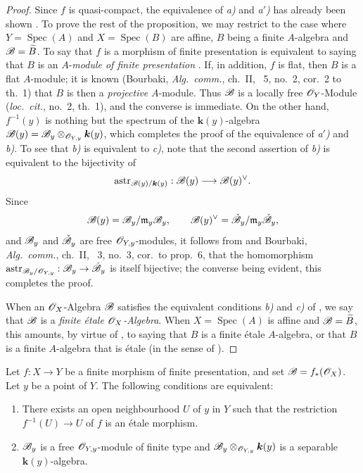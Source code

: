 \begin{proof}
Since $f$ is quasi-compact, the equivalence of \emph{a)} and \emph{a$'$)} has already been shown .
To prove the rest of the proposition, we may restrict to the case where $Y=\operatorname{Spec}(A)$ and $X=\operatorname{Spec}(B)$ are affine, $B$ being a finite $A$-algebra and $\mathscr{B}=\widetilde{B}$.
To say that $f$ is a morphism of finite presentation is equivalent to saying that $B$ is an $A$-\emph{module of finite presentation} .
If, in addition, $f$ is flat, then $B$ is a flat $A$-module; it is known (Bourbaki, \emph{Alg.\ comm.}, ch.~II, \textsection~5, no.~2, cor.~2 to th.~1) that $B$ is then a \emph{projective} $A$-module.  Thus $\mathscr{B}$ is a locally free $\mathscr{O}_Y$-Module (\emph{loc.\ cit.}, no.~2, th.~1), and the converse is immediate.
On the other hand, $f^{-1}(y)$ is nothing but the spectrum of the $\boldsymbol{k}(y)$-algebra $\mathscr{B}(y)=\mathscr{B}_y\otimes_{\mathscr{O}_{Y,y}}\boldsymbol{k}(y)$, which completes the proof of the equivalence of \emph{a$'$)} and \emph{b)}.
To see that \emph{b)} is equivalent to \emph{c)}, note that the second assertion of \emph{b)} is equivalent to the bijectivity of
\[
 \operatorname{astr}_{\mathscr{B}(y)/\boldsymbol{k}(y)}:\mathscr{B}(y)\longrightarrow\mathscr{B}(y)^\vee.
\]
Since
\[
 \mathscr{B}(y)=\mathscr{B}_y/\mathfrak{m}_y\mathscr{B}_y,
 \qquad
 \mathscr{B}(y)^\vee=\check{\mathscr{B}}_y/\mathfrak{m}_y\check{\mathscr{B}}_y,
\]
and $\mathscr{B}_y$ and $\check{\mathscr{B}}_y$ are free $\mathscr{O}_{Y,y}$-modules, it follows from  and Bourbaki, \emph{Alg.\ comm.}, ch.~II, \textsection~3, no.~3, cor.\ to prop.~6, that the homomorphism $\operatorname{astr}_{\mathscr{B}_y/\mathscr{O}_{Y,y}}:\mathscr{B}_y\to\check{\mathscr{B}}_y$ is itself bijective;
the converse being evident, this completes the proof.

When an $\mathscr{O}_X$-Algebra $\mathscr{B}$ satisfies the equivalent conditions \emph{b)} and \emph{c)} of , we say that $\mathscr{B}$ is a \emph{finite \'etale $\mathscr{O}_X$-Algebra}.
When $X=\operatorname{Spec}(A)$ is affine and $\mathscr{B}=\widetilde{B}$, this amounts, by virtue of , to saying that $B$ is a finite \'etale $A$-algebra, or that $B$ is a finite $A$-algebra that is \'etale (in the sense of ).
\end{proof}

\begin{corollary}[18.2.4]
\label{IV.18.2.4}
Let $f:X\to Y$ be a finite morphism of finite presentation, and set $\mathscr{B}=f_*(\mathscr{O}_X)$.
Let $y$ be a point of $Y$.
The following conditions are equivalent:
\begin{enumerate}[label=\emph{\alph*)}]
  \item There exists an open neighbourhood $U$ of $y$ in $Y$ such that the restriction $f^{-1}(U)\to U$ of $f$ is an \'etale morphism.
  \item $\mathscr{B}_y$ is a free $\mathscr{O}_{Y,y}$-module of finite type and $\mathscr{B}_y\otimes_{\mathscr{O}_{Y,y}}\boldsymbol{k}(y)$ is a separable $\boldsymbol{k}(y)$-algebra.
\end{enumerate}
\end{corollary}

